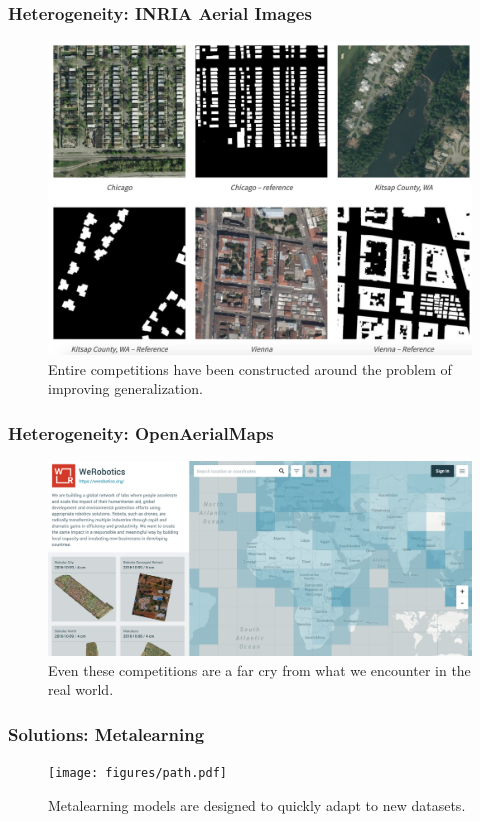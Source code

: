 \documentclass[10pt,mathserif]{beamer}
\begin{document}
\begin{frame}
  \frametitle{Heterogeneity: INRIA Aerial Images}
  \begin{figure}[ht]
    \centering
    \includegraphics[options]{figures/inria}
    \caption{Entire competitions have been constructed around the problem of
      improving generalization. \label{fig:label} }
  \end{figure}
\end{frame}

\begin{frame}
  \frametitle{Heterogeneity: OpenAerialMaps}
  \begin{figure}[ht]
    \centering
    \includegraphics[options]{figures/openaerialmaps}
    \caption{Even these competitions are a far cry from what we encounter in the
      real world.
      \label{fig:label} }
  \end{figure}
\end{frame}

\begin{frame}[]
  \frametitle{Solutions: Metalearning}
\begin{figure}[ht]
  \centering
  \texttt{[image: figures/path.pdf]}
  \caption{Metalearning models are designed to quickly adapt to new
    datasets. \label{fig:label} }
\end{figure}
\end{frame}
\end{document}

